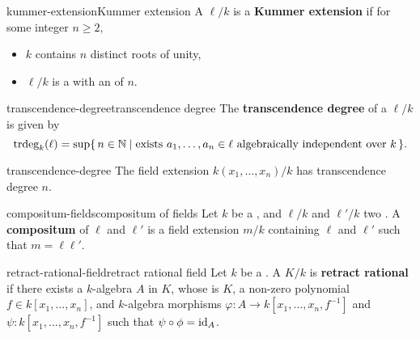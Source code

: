 \begin{topic}{kummer-extension}{Kummer extension}
    A  $\ell/k$ is a \textbf{Kummer extension} if for some integer $n \ge 2$,
    \begin{itemize}
        \item $k$ contains $n$ distinct roots of unity,
        \item $\ell/k$ is a  with an   of  $n$.
    \end{itemize}
\end{topic}

\begin{topic}{transcendence-degree}{transcendence degree}
    The \textbf{transcendence degree} of a  $\ell/k$ is given by
    \[ \textup{trdeg}_k(\ell) = \sup \{\, n \in \mathbb{N} \mid \textup{exists } a_1, \ldots, a_n \in \ell \textup{ algebraically independent over } k \,\} . \]
\end{topic}

\begin{example}{transcendence-degree}
    The field extension $k(x_1, \ldots, x_n) / k$ has transcendence degree $n$.
\end{example}

\begin{topic}{compositum-fields}{compositum of fields}
    Let $k$ be a , and $\ell/k$ and $\ell'/k$ two . A \textbf{compositum} of $\ell$ and $\ell'$ is a field extension $m/k$ containing $\ell$ and $\ell'$ such that $m = \ell \ell'$.
\end{topic}

\begin{topic}{retract-rational-field}{retract rational field}
    Let $k$ be a . A  $K/k$ is \textbf{retract rational} if there exists a $k$-algebra $A$ in $K$, whose  is $K$, a non-zero polynomial $f \in k[x_1, \ldots, x_n]$, and $k$-algebra morphisms $\varphi : A \to k[x_1, \ldots, x_n, f^{-1}]$ and $\psi : k[x_1, \ldots, x_n, f^{-1}]$ such that $\psi \circ \phi = \textup{id}_A$.
\end{topic}
